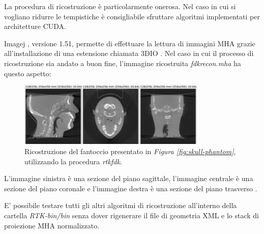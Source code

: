 \documentclass[a4paper,12pt, doubleside]{report}
\begin{document}
                La procedura di ricostruzione è particolarmente onerosa. Nel caso in cui si vogliano ridurre le tempistiche è consigliabile sfruttare algoritmi implementati per architetture CUDA.
            
            \bigskip    
            \par
                Imagej \cite{imagej}, versione 1.51, permette di effettuare la lettura di immagini MHA grazie all'installazione di una estensione chiamata 3DIO \cite{imagej-3dio-plugin}. Nel caso in cui il processo di ricostruzione sia andato a buon fine, l'immagine ricostruita \textit{fdk\textunderscore recon.mha} ha questo aspetto:
                    
                \begin{figure}[h]        
                    \centering
                    \includegraphics[width=0.8\textwidth]{reconstruction}
                    \caption{Ricostruzione del fantoccio presentato in \textit{Figura \ref{fig:skull-phantom}}, utilizzando la procedura \textit{rtkfdk}.}
                    \label{fig:reconstruction}
                \end{figure}
                
                L'immagine sinistra è una sezione del piano sagittale, l'immagine centrale è una sezione del piano coronale e l'immagine destra è una sezione del piano trasverso \cite{planes}.
                
            \bigskip
            \par
                E' possibile testare tutti gli altri algoritmi di ricostruzione all'interno della cartella \textit{RTK-bin/bin} senza dover rigenerare il file di geometria XML e lo stack di proiezione MHA normalizzato. 
            
            
\end{document}
